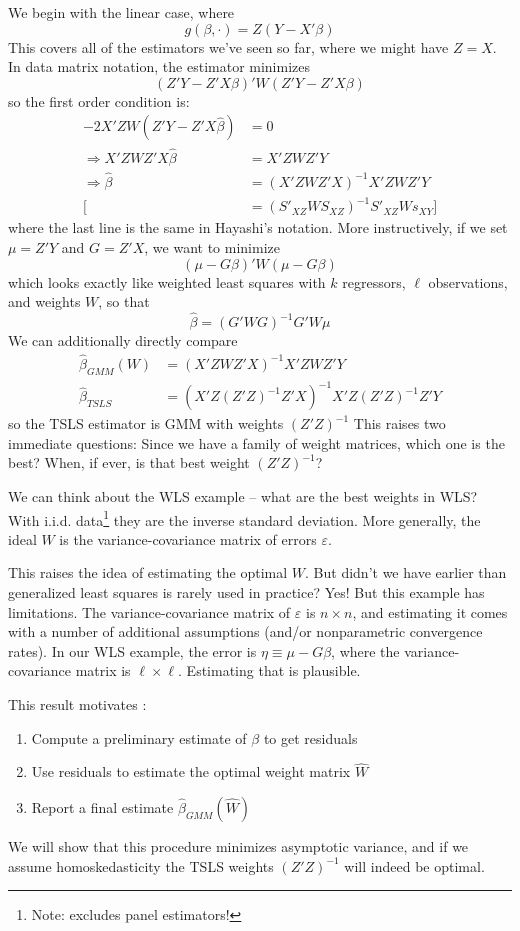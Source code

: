 \documentclass[10pt]{article}
\begin{document}
\begin{example}
	We begin with the linear case, where \[g(\beta,\cdot) = Z(Y-X'\beta)\]This covers all of the estimators we've seen so far, where we might have $Z = X$. In data matrix notation, the estimator minimizes \[(Z'Y - Z'X\beta)'W(Z'Y - Z'X\beta)\]so the first order condition is:\begin{align*} -2X'ZW(Z'Y - Z'X\hat{\beta}) &= 0 \\ \Longrightarrow X'ZWZ'X \hat{\beta} &= X'ZWZ'Y \\ \Longrightarrow \hat{\beta} &= (X'ZWZ'X)^{-1} X'ZWZ'Y \\ \Big[&= (S'_{XZ}WS_{XZ})^{-1} S'_{XZ}Ws_{XY}\Big]  \end{align*}where the last line is the same in Hayashi's notation. More instructively, if we set $\mu = Z'Y$ and $G = Z'X$, we want to minimize \[(\mu - G\beta)'W(\mu - G\beta)\]which looks exactly like weighted least squares with $k$ regressors, $\ell$ observations, and weights $W$, so that \[\hat{\beta} = (G'WG)^{-1} G'W\mu\]We can additionally directly compare\begin{align*} \hat{\beta}_{GMM}(W) &= (X'ZWZ'X)^{-1} X'ZWZ'Y \\ \hat{\beta}_{TSLS} &= (X'Z(Z'Z)^{-1}Z'X)^{-1}X'Z(Z'Z)^{-1}Z'Y\end{align*}so the TSLS estimator is GMM with weights $(Z'Z)^{-1}$ This raises two immediate questions: Since we have a family of weight matrices, which one is the best? When, if ever, is that best weight $(Z'Z)^{-1}$?
	
	We can think about the WLS example -- what are the best weights in WLS? With i.i.d. data\footnote{Note: excludes panel estimators!} they are the inverse standard deviation. More generally, the ideal $W$ is the variance-covariance matrix of errors $\varepsilon$.
	
	This raises the idea of estimating the optimal $W$. But didn't we have earlier than generalized least squares is rarely used in practice? Yes! But this example has limitations. The variance-covariance matrix of $\varepsilon$ is $n \times n$, and estimating it comes with a number of additional assumptions (and/or nonparametric convergence rates). In our WLS example, the error is $\eta \equiv \mu - G\beta$, where the variance-covariance matrix is $\ell \times \ell$. Estimating that is plausible.
	
	This result motivates :
	\begin{enumerate}
		\item Compute a preliminary estimate of $\beta$ to get residuals
		\item Use residuals to estimate the optimal weight matrix $\hat{W}$
		\item Report a final estimate $\hat{\beta}_{GMM}(\hat{W})$
	\end{enumerate}
	We will show that this procedure minimizes asymptotic variance, and if we assume homoskedasticity the TSLS weights $(Z'Z)^{-1}$ will indeed be optimal.
\end{example}
\end{document}
